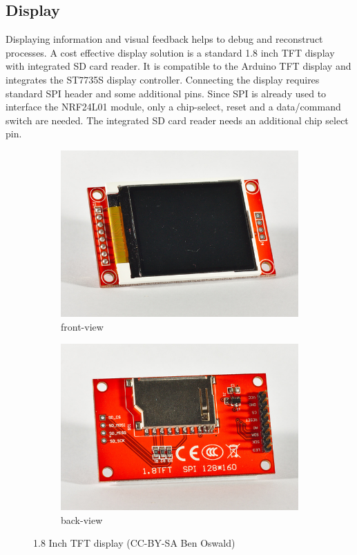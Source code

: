 \subsection{Display}
Displaying information and visual feedback helps to debug and reconstruct processes. A cost effective display solution is a standard 1.8 inch TFT display with integrated SD card reader. It is compatible to the Arduino TFT display and integrates the ST7735S display controller. Connecting the display requires standard SPI header and some additional pins. Since SPI is already used to interface the NRF24L01 module, only a chip-select, reset and a data/command switch are needed. The integrated SD card reader needs an additional chip select pin.

\begin{figure}[H]
  \centering
  \begin{subfigure}{0.48\textwidth}
  \centering
  \includegraphics[width=0.9\linewidth]{images/30_tftfront.jpg}
  \caption{front-view}
  \end{subfigure}
  \begin{subfigure}{0.48\textwidth}
  \centering
  \includegraphics[width=0.9\linewidth]{images/30_tftback.jpg}
  \caption{back-view}
  \end{subfigure}
  \caption{1.8 Inch TFT display (CC-BY-SA Ben Oswald)}
\end{figure}


